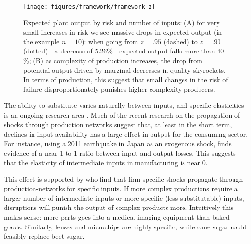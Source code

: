 \documentclass[11pt]{article}
\begin{document}
\begin{figure}[htpb]
	\centering
	\texttt{[image: figures/framework/framework\_z]}
	\caption{Expected plant output by risk and number of inputs: (A) for very small increases in risk we see massive drops in expected output (in the example \(n = 10\)): when going from \(z = .95\) (dashed) to \(z = .90\) (dotted) - a decrease of 5.26\% - expected output falls more than 40 \%; (B) as complexity of production increases, the drop from potential output driven by marginal decreases in quality skyrockets. In terms of production, this suggest that small changes in the risk of failure disproportionately punishes higher complexity producers.}%
	\label{fig:framework-z}
\end{figure}

The ability to substitute varies naturally between inputs, and specific elasticities is an ongoing research area \citep{brummitt_contagious_2017,carvalho_micro_2014}. Much of the recent research on the propagation of shocks through production networks suggest that, at least in the short term, declines in input availability has a large effect in output for the consuming sector. For instance, using a 2011 earthquake in Japan as an exogenous shock, \cite{boehm_input_2019-1} finds evidence of a near 1-to-1 ratio between input and output losses. This suggests that the elasticity of intermediate inputs in manufacturing is near 0.

This effect is supported by \cite{barrot_input_2016} who find that firm-specific shocks propagate through production-networks for specific inputs. If more complex productions require a larger number of intermediate inputs or more specific (less substitutable) inputs, disruptions will punish the output of complex products more. Intuitively this makes sense: more parts goes into a medical imaging equipment than baked goods. Similarly, lenses and microchips are highly specific, while cane sugar could feasibly replace beet sugar.
\end{document}
